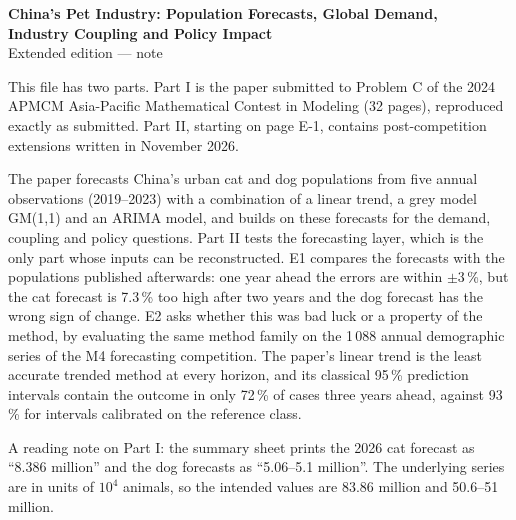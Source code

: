 
\graphicspath{{../../figures/extension/}}

\thispagestyle{empty}
\begin{center}
{\Large\bfseries China's Pet Industry: Population Forecasts, Global Demand,\\[0.2em] Industry Coupling and Policy Impact}\\[0.7em]
{\large Extended edition --- note}
\end{center}
\vspace{0.8em}

This file has two parts. Part I is the paper submitted to Problem C of the 2024 APMCM Asia-Pacific Mathematical Contest in Modeling (32 pages), reproduced exactly as submitted. Part II, starting on page E-1, contains post-competition extensions written in November 2026.

The paper forecasts China's urban cat and dog populations from five annual observations (2019--2023) with a combination of a linear trend, a grey model GM(1,1) and an ARIMA model, and builds on these forecasts for the demand, coupling and policy questions. Part II tests the forecasting layer, which is the only part whose inputs can be reconstructed. E1 compares the forecasts with the populations published afterwards: one year ahead the errors are within $\pm 3$\,\%, but the cat forecast is 7.3\,\% too high after two years and the dog forecast has the wrong sign of change. E2 asks whether this was bad luck or a property of the method, by evaluating the same method family on the 1\,088 annual demographic series of the M4 forecasting competition. The paper's linear trend is the least accurate trended method at every horizon, and its classical 95\,\% prediction intervals contain the outcome in only 72\,\% of cases three years ahead, against 93\,\% for intervals calibrated on the reference class.

A reading note on Part I: the summary sheet prints the 2026 cat forecast as ``8.386 million'' and the dog forecasts as ``5.06--5.1 million''. The underlying series are in units of $10^4$ animals, so the intended values are 83.86 million and 50.6--51 million.

